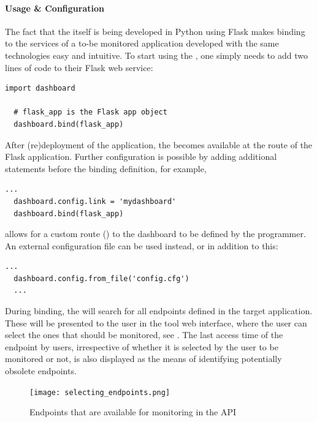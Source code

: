 \documentclass{sig-alternate-05-2015}
\begin{document}
  \paragraph{Usage \& Configuration}
  
  The fact that the \tool itself is being developed in Python using Flask makes binding to the services of a to-be monitored application developed with the same technologies easy and intuitive. 
  To start using the \tool, one simply needs to add two lines of code to their Flask web service:

  \begin{lstlisting}[style=custompython]
  import dashboard

  # flask_app is the Flask app object
  dashboard.bind(flask_app)
  \end{lstlisting}

  After (re)deployment of the application, the \tool becomes available at the  route of the Flask application. Further configuration is possible by adding additional statements before the binding definition, for example,

  \begin{lstlisting}[style=custompython]
  ...
  dashboard.config.link = 'mydashboard'
  dashboard.bind(flask_app)
  \end{lstlisting}
  
  allows for a custom route () to the dashboard to be defined by the programmer. An external configuration file can be used instead, or in addition to this:
  
  \begin{lstlisting}[style=custompython]
  ...
  dashboard.config.from_file('config.cfg')
  ...
  \end{lstlisting}

  During binding, the \tool will search for all endpoints defined in the target application. These will be presented to the user in the tool web interface, where the user can select the ones that should be monitored, see . The last access time of the endpoint by users, irrespective of whether it is selected by the user to be monitored or not, is also displayed as the means of identifying potentially obsolete endpoints.

    \begin{figure}
      \centering
      \texttt{[image: selecting\_endpoints.png]}
      \caption{Endpoints that are available for monitoring in the \zee API}
      \label{fig:sep}
    \end{figure}
\end{document}
